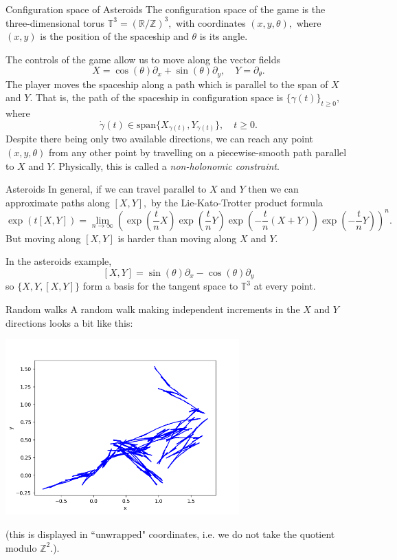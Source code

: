 \documentclass{beamer}
\numberwithin{equation}{section}
\theoremstyle{plain}
\theoremstyle{plain}
\theoremstyle{definition}
\theoremstyle{plain}
\theoremstyle{plain}
\theoremstyle{definition}
\newcommand{\Rl}{\mathbb{R}}
\newcommand{\Itgr}{\mathbb{Z}}
\newcommand{\Circ}{\mathbb{T}}
\begin{document}
\begin{frame}{Configuration space of Asteroids}
  The configuration space of the game is the three-dimensional torus $\Circ^3 = (\Rl/\Itgr)^3,$ with coordinates $(x,y,\theta),$ where $(x,y)$ is the position of the spaceship and $\theta$ is its angle.

  The controls of the game allow us to move along the vector fields
  \[
    X = \cos(\theta)\partial_x+\sin(\theta)\partial_y,\quad Y = \partial_\theta.
  \]
  \pause
  The player moves the spaceship along a path which is parallel to the span of $X$ and $Y.$ That is, the path of the spaceship in configuration space is $\{\gamma(t)\}_{t\geq 0},$ where
  \[
    \dot{\gamma}(t) \in \mathrm{span}\{X_{\gamma(t)},Y_{\gamma(t)}\},\quad t\geq 0.
  \]
  \pause
  Despite there being only two available directions, we can reach any point $(x,y,\theta)$ from any other point by travelling on a piecewise-smooth path parallel to $X$ and $Y.$
  \pause
  Physically, this is called a \emph{non-holonomic constraint}.
\end{frame}

\begin{frame}{Asteroids}
  In general, if we can travel parallel to $X$ and $Y$ then we can approximate paths along $[X,Y],$ by the Lie-Kato-Trotter product formula
  \[
    \exp(t[X,Y]) = \lim_{n\to\infty} (\exp(\frac{t}{n}X)\exp(\frac{t}{n}Y)\exp(-\frac{t}{n}(X+Y))\exp(-\frac{t}{n}Y))^n.
  \]
  But moving along $[X,Y]$ is harder than moving along $X$ and $Y.$

  In the asteroids example,
  \[
    [X,Y] = \sin(\theta)\partial_x-\cos(\theta)\partial_y
  \]
  so $\{X,Y,[X,Y]\}$ form a basis for the tangent space to $\Circ^3$ at every point.
\end{frame}

\begin{frame}{Random walks}
  A random walk making independent increments in the $X$ and $Y$ directions looks a bit like this:
  \begin{center}
  \includegraphics[width=90mm]{xy_coords_single_paths.png}
  \end{center}
  (this is displayed in ``unwrapped" coordinates, i.e. we do not take the quotient modulo $\Itgr^2.$).
\end{frame}
\end{document}
